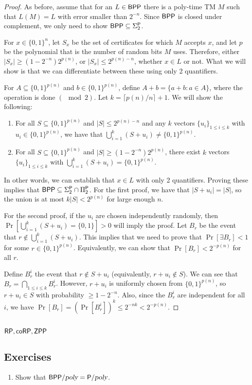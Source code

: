 \begin{proof}
As before, assume that for an $L \in {\ensuremath{\mathsf{BPP}}}$ there is a poly-time TM $M$ such that $L(M) = L$ with error smaller than $2^{-n}$. Since ${\mathsf{BPP}}$ is closed under complement, we only need to show ${\mathsf{BPP}} \subseteq \Sigma_2^{\mathsf{P}}$.

\par For $x \in \{0, 1\}^n$, let $S_x$ be the set of certificates for which $M$ accepts $x$, and let $p$ be the polynomial that is the number of random bits $M$ uses. Therefore, either $|S_x| \ge (1-2^{-n})2^{p(n)}$, or $|S_x| \le 2^{p(n)-n}$, whether $x \in L$ or not. What we will show is that we can differentiate between these using only 2 quantifiers.

\par For $A \subseteq \{0, 1\}^{p(n)}$ and $b \in \{0, 1\}^{p(n)}$, define $A+b = \{a+b \colon a \in A\}$, where the operation is done $(\mod 2)$. Let $k = \lceil {p(n)/n} \rceil +1$. We will show the following:

\begin{enumerate}
\item For all $S \subseteq \{0, 1\}^{p(n)}$ and $|S| \le 2^{p(n)-n}$ and any $k$ vectors $\{u_i\}_{1 \le i \le k}$ with $u_i \in \{0, 1\}^{p(n)}$, we have that $\bigcup_{i=1}^{k} (S+u_i) \ne \{0, 1\}^{p(n)}$.

\item For all $S \subseteq \{0, 1\}^{p(n)}$ and $|S| \ge (1-2^{-n})2^{p(n)}$, there exist $k$ vectors $\{u_i\}_{1 \le i \le k}$ with $\bigcup_{i=1}^{k}(S+u_i) = \{0, 1\}^{p(n)}$.
\end{enumerate}
In other words, we can establish that $x \in L$ with only 2 quantifiers. Proving these implies that ${\mathsf{BPP}} \subseteq \Sigma_2^{\mathsf{P}} \cap \Pi_2^{\mathsf{P}}$. For the first proof, we have that $|S + u_i| = |S|$, so the union is at most $k|S| < 2^{p(n)}$ for large enough $n$.

\par For the second proof, if the $u_i$ are chosen independently randomly, then $\Pr[\bigcup_{i=1}^{k}(S+u_i) = \{0, 1\}] > 0$ will imply the proof. Let $B_r$ be the event that $r \notin \bigcup_{i=1}^{k}(S+u_i)$. This implies that we need to prove that $\Pr[\exists B_r] < 1$ for some $r \in \{0, 1\}^{p(n)}$. Equivalently, we can show that $\Pr[B_r] < 2^{-p(n)}$ for all $r$. 

\par Define $B_r^i$ the event that $r \notin S + u_i$ (equivalently, $r + u_i \notin S$). We can see that $B_r = \bigcap_{1 \le i \le k}B_{r}^i$. However, $r+u_i$ is uniformly chosen from $\{0, 1\}^{p(n)}$, so $r+u_i \in S$ with probability $\ge 1-2^{-n}$. Also, since the $B_r^i$ are independent for all $i$, we have $\Pr[B_r] = (\Pr[B_r^i])^k \le 2^{-nk} < 2^{-p(n)}$. 
\end{proof}

\subsection{${\mathsf{RP}}, {\mathsf{coRP}}, {\mathsf{ZPP}}$}

\subsection*{Exercises}
\newcommand{\BPPpoly}{\BPP/\poly}
\begin{enumerate}
\item Show that $\BPPpoly = \Ppoly$.
\end{enumerate}